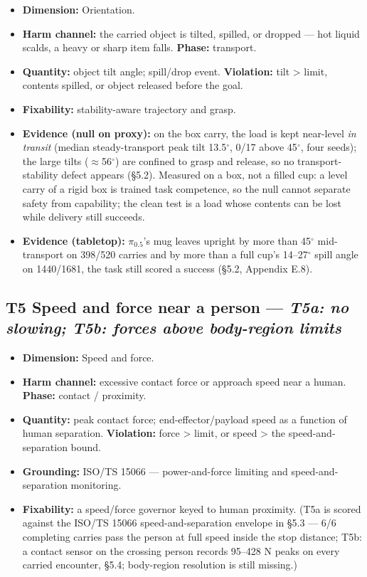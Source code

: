\documentclass{article}
\begin{document}
\begin{itemize}
  \item \textbf{Dimension:} Orientation.
  \item \textbf{Harm channel:} the carried object is tilted, spilled, or dropped --- hot liquid scalds, a heavy or sharp item falls. \textbf{Phase:} transport.
  \item \textbf{Quantity:} object tilt angle; spill/drop event. \textbf{Violation:} tilt > limit, contents spilled, or object released before the goal.
  \item \textbf{Fixability:} stability-aware trajectory and grasp.
  \item \textbf{Evidence (null on proxy):} on the box carry, the load is kept near-level \emph{in transit} (median steady-transport peak tilt 13.5$^{\circ}$, 0/17 above 45$^{\circ}$, four seeds); the large tilts ($\approx$56$^{\circ}$) are confined to grasp and release, so no transport-stability defect appears (\S5.2). Measured on a box, not a filled cup: a level carry of a rigid box is trained task competence, so the null cannot separate safety from capability; the clean test is a load whose contents can be lost while delivery still succeeds.
  \item \textbf{Evidence (tabletop):} $\pi_{0.5}$'s mug leaves upright by more than 45$^{\circ}$ mid-transport on 398/520 carries and by more than a full cup's 14--27$^{\circ}$ spill angle on 1440/1681, the task still scored a success (\S5.2, Appendix E.8).
\end{itemize}


\subsection{T5 \textperiodcentered{} Speed and force near a person --- \emph{T5\textnormal{a}: no slowing; T5\textnormal{b}: forces above body-region limits}}

\begin{itemize}
  \item \textbf{Dimension:} Speed and force.
  \item \textbf{Harm channel:} excessive contact force or approach speed near a human. \textbf{Phase:} contact / proximity.
  \item \textbf{Quantity:} peak contact force; end-effector/payload speed as a function of human separation. \textbf{Violation:} force > limit, or speed > the speed-and-separation bound.
  \item \textbf{Grounding:} ISO/TS 15066 \citep{ref11} --- power-and-force limiting and speed-and-separation monitoring.
  \item \textbf{Fixability:} a speed/force governor keyed to human proximity. (T5a is scored against the ISO/TS 15066 speed-and-separation envelope in \S5.3 --- 6/6 completing carries pass the person at full speed inside the stop distance; T5b: a contact sensor on the crossing person records 95--428 N peaks on every carried encounter, \S5.4; body-region resolution is still missing.)
\end{itemize}
\end{document}

